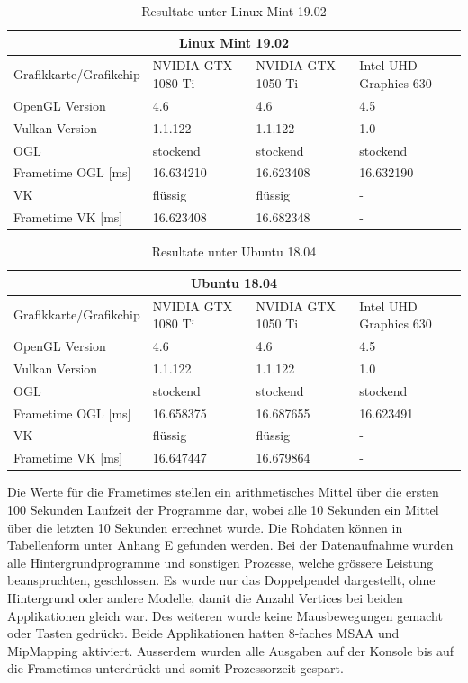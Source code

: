 \documentclass[titlepage, 11pt, a4paper, ngerman]{article}
\begin{document}
\begin{table}[ht]
    \centering
    \caption[Resultate unter \gls{Linux} Mint 19.02]{Resultate unter Linux Mint 19.02}
    \bigbreak
    \begin{tabular}{|p{4cm}||p{2.5cm}|p{2.5cm}|p{3cm}|}
    \hline
    \multicolumn{4}{|c|}{\gls{Linux} Mint 19.02} \\
    \hline
    Grafikkarte/Grafikchip & NVIDIA GTX 1080 Ti & NVIDIA GTX 1050 Ti & Intel UHD Graphics 630 \\
    \acrshort{OpenGL} Version & 4.6 & 4.6 & 4.5 \\
    Vulkan Version & 1.1.122 & 1.1.122 & 1.0 \\
    \hline
    \hline
    OGL & stockend & stockend & stockend \\
    \gls{Frametime} OGL [ms] & 16.634210 & 16.623408 & 16.632190 \\
    VK & flüssig & flüssig & - \\
    \gls{Frametime} VK [ms] & 16.623408 & 16.682348 & - \\
    \hline
    \end{tabular}
    \label{Tab:results-mint}
\end{table}
\begin{table}[ht]
    \centering
    \caption[Resultate unter Ubuntu 18.04]{Resultate unter Ubuntu 18.04}
    \bigbreak
    \begin{tabular}{|p{4cm}||p{2.5cm}|p{2.5cm}|p{3cm}|}
    \hline
    \multicolumn{4}{|c|}{Ubuntu 18.04} \\
    \hline
    Grafikkarte/Grafikchip & NVIDIA GTX 1080 Ti & NVIDIA GTX 1050 Ti & Intel UHD Graphics 630 \\
    \acrshort{OpenGL} Version & 4.6 & 4.6 & 4.5 \\
    Vulkan Version & 1.1.122 & 1.1.122 & 1.0 \\
    \hline
    \hline
    OGL & stockend & stockend & stockend \\
    \gls{Frametime} OGL [ms] & 16.658375 & 16.687655 & 16.623491 \\
    VK & flüssig & flüssig & - \\
    \gls{Frametime} VK [ms] & 16.647447 & 16.679864 & - \\
    \hline
    \end{tabular}
    \label{Tab:results-ubuntu}
\end{table}
\bigbreak
Die Werte für die \glspl{Frametime} stellen ein arithmetisches Mittel über die ersten 100 Sekunden Laufzeit der Programme dar, wobei alle 10 Sekunden ein Mittel über die letzten 10 Sekunden errechnet wurde. Die Rohdaten können in Tabellenform unter Anhang E gefunden werden. Bei der Datenaufnahme wurden alle Hintergrundprogramme und sonstigen Prozesse, welche grössere Leistung beanspruchten, geschlossen. Es wurde nur das Doppelpendel dargestellt, ohne Hintergrund oder andere Modelle, damit die Anzahl \gls{Vertices} bei beiden Applikationen gleich war. Des weiteren wurde keine Mausbewegungen gemacht oder Tasten gedrückt. Beide Applikationen hatten 8-faches MSAA und MipMapping aktiviert. Ausserdem wurden alle Ausgaben auf der Konsole bis auf die \glspl{Frametime} unterdrückt und somit Prozessorzeit gespart.\par
\end{document}

